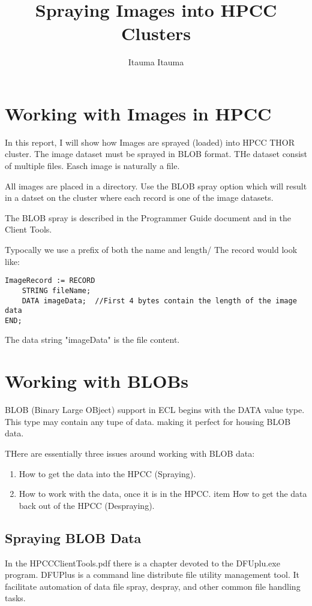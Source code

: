 \documentclass[11pt,a4paper]{report}
\author{Itauma Itauma}
\title{Spraying Images into HPCC Clusters}
\begin{document}
\maketitle
\tableofcontents
\newpage
\section{Working with Images in HPCC}

In this report, I will show how Images are sprayed (loaded) into HPCC THOR cluster. The image dataset must be sprayed in BLOB format. THe dataset consist of multiple files. Easch image is naturally a file.

All images are placed in a directory. Use the BLOB spray option which will result in a datset on the cluster where each record is one of the image datasets.

The BLOB spray is described in the Programmer Guide document and in the Client Tools.

Typocally we use a prefix of both the name and length/ The record would look like:

\begin{verbatim}
ImageRecord := RECORD
	STRING fileName;
	DATA imageData;  //First 4 bytes contain the length of the image data
END;
\end{verbatim}

The data string "imageData" is the file content.

\section{Working with BLOBs}

BLOB (Binary Large OBject) support in ECL begins with the DATA value type. This type may contain any tupe of data. making it perfect for housing BLOB data.

THere are essentially three issues around working with BLOB data:

\begin{enumerate}
	\item How to get the data into the HPCC (Spraying).
	\item How to work with the data, once it is in the HPCC.
	item How to get the data back out of the HPCC (Despraying).
\end{enumerate}

	\subsection{Spraying BLOB Data}
	In the HPCCClientTools.pdf there is a chapter devoted to the DFUplu.exe program. DFUPlus is a command line distribute file utility management tool. It facilitate automation of data file spray, despray, and other common file handling tasks.
	
\end{document}
